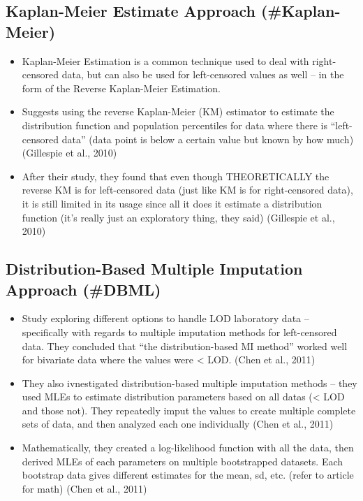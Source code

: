 \documentclass[12pt, twoside]{amherstthesis}
\begin{document}
\hypertarget{kaplan-meier-estimate-approach-kaplan-meier}{%
\subsection{Kaplan-Meier Estimate Approach (\#Kaplan-Meier)}\label{kaplan-meier-estimate-approach-kaplan-meier}}
\begin{itemize}
\item
  Kaplan-Meier Estimation is a common technique used to deal with right-censored data, but can also be used for left-censored values as well -- in the form of the Reverse Kaplan-Meier Estimation.
\item
  Suggests using the reverse Kaplan-Meier (KM) estimator to estimate the distribution function and population percentiles for data where there is ``left-censored data'' (data point is below a certain value but known by how much) (Gillespie et al., 2010)
\item
  After their study, they found that even though THEORETICALLY the reverse KM is for left-censored data (just like KM is for right-censored data), it is still limited in its usage since all it does it estimate a distribution function (it's really just an exploratory thing, they said) (Gillespie et al., 2010)
\end{itemize}
\hypertarget{distribution-based-multiple-imputation-approach-dbml}{%
\subsection{Distribution-Based Multiple Imputation Approach (\#DBML)}\label{distribution-based-multiple-imputation-approach-dbml}}
\begin{itemize}
\item
  Study exploring different options to handle LOD laboratory data -- specifically with regards to multiple imputation methods for left-censored data. They concluded that ``the distribution-based MI method'' worked well for bivariate data where the values were \textless{} LOD. (Chen et al., 2011)
\item
  They also ivnestigated distribution-based multiple imputation methods -- they used MLEs to estimate distribution parameters based on all datas (\textless{} LOD and those not). They repeatedly imput the values to create multiple complete sets of data, and then analyzed each one individually (Chen et al., 2011)
\item
  Mathematically, they created a log-likelihood function with all the data, then derived MLEs of each parameters on multiple bootstrapped datasets. Each bootstrap data gives different estimates for the mean, sd, etc. (refer to article for math) (Chen et al., 2011)
\end{itemize}
\end{document}
